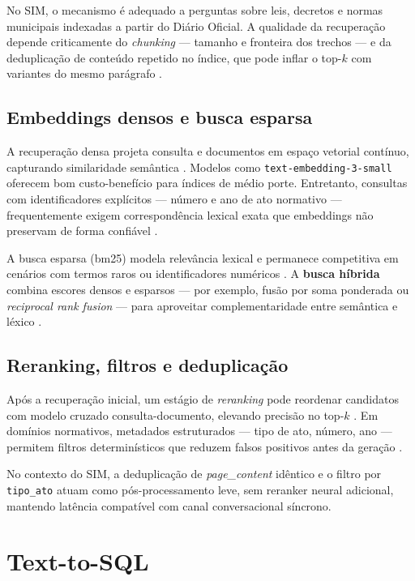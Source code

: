 No SIM, o mecanismo é adequado a perguntas sobre leis, decretos e normas municipais indexadas a partir do Diário Oficial. A qualidade da recuperação depende criticamente do \textit{chunking} --- tamanho e fronteira dos trechos --- e da deduplicação de conteúdo repetido no índice, que pode inflar o top-$k$ com variantes do mesmo parágrafo \cite{Asai2024SelfRAG}.

\subsection{Embeddings densos e busca esparsa}

A recuperação densa projeta consulta e documentos em espaço vetorial contínuo, capturando similaridade semântica \cite{Karpukhin2020DPR}. Modelos como \texttt{text-embedding-3-small} oferecem bom custo-benefício para índices de médio porte. Entretanto, consultas com identificadores explícitos --- número e ano de ato normativo --- frequentemente exigem correspondência lexical exata que embeddings não preservam de forma confiável \cite{Robertson2009BM25}.

A busca esparsa (\gls{bm25}) modela relevância lexical e permanece competitiva em cenários com termos raros ou identificadores numéricos \cite{Robertson2009BM25}. A \textbf{busca híbrida} combina escores densos e esparsos --- por exemplo, fusão por soma ponderada ou \textit{reciprocal rank fusion} --- para aproveitar complementaridade entre semântica e léxico \cite{Lin2021Hybrid,Lin2021Pyserini}.

\subsection{Reranking, filtros e deduplicação}

Após a recuperação inicial, um estágio de \textit{reranking} pode reordenar candidatos com modelo cruzado consulta-documento, elevando precisão no top-$k$ \cite{Nogueira2019MonoT5}. Em domínios normativos, metadados estruturados --- tipo de ato, número, ano --- permitem filtros determinísticos que reduzem falsos positivos antes da geração \cite{Gao2024RAGSurvey}.

No contexto do SIM, a deduplicação de \textit{page\_content} idêntico e o filtro por \texttt{tipo\_ato} atuam como pós-processamento leve, sem reranker neural adicional, mantendo latência compatível com canal conversacional síncrono.

\section{Text-to-SQL}

